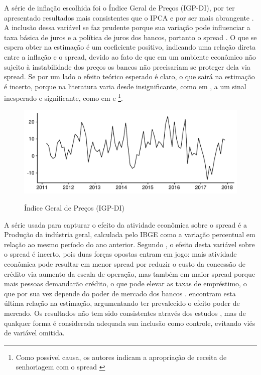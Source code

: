 \documentclass[a4paper, article, 12pt, openany, oneside, english, brazil]{abntex2}
\begin{document}
    A série de inflação escolhida foi o Índice Geral de Preços (IGP-DI), por ter apresentado resultados mais consistentes que o IPCA \cite[p.~66]{rocha09} e por ser mais abrangente \cite[p.~21]{afanasieff02}. A inclusão dessa variável se faz prudente porque sua variação pode influenciar a taxa básica de juros e a política de juros dos bancos, portanto o spread \cite[p.~14]{bignotto06}. O que se espera obter na estimação é um coeficiente positivo, indicando uma relação direta entre a inflação e o spread, devido ao fato de que em um ambiente econômico não sujeito à instabilidade dos preços os bancos não precisariam se proteger dela via spread. Se por um lado o efeito teórico esperado é claro, o que sairá na estimação é incerto, porque na literatura varia desde insignificante, como em , a um sinal inesperado e significante, como em  e \footnote{Como possível causa, os autores indicam a apropriação de receita de senhoriagem com o spread \cite[p.~25]{afanasieff02}}.
    
\begin{figure}[h]
  \centering
    \caption{Índice Geral de Preços (IGP-DI)}
      \includegraphics[width = \textwidth, scale=0.75]{IGP.pdf}
      \label{ipca}
\end{figure}
    
A série usada para capturar o efeito da atividade econômica sobre o spread é a Produção da indústria geral, calculada pelo IBGE como a variação percentual em relação ao mesmo período do ano anterior. Segundo , o efeito desta variável sobre o spread é incerto, pois duas forças opostas entram em jogo: mais atividade econômica pode resultar em menor spread por reduzir o custo da concessão de crédito via aumento da escala de operação, mas também em maior spread porque mais pessoas demandarão crédito, o que pode elevar as taxas de empréstimo, o que por sua vez depende do poder de mercado dos bancos .  encontram esta última relação na estimação, argumentando ter prevalecido o efeito poder de mercado. Os resultados não tem sido consistentes através dos estudos \cite[p.~236]{leal07}, mas de qualquer forma é considerada adequada sua inclusão como controle, evitando viés de variável omitida.
    
\end{document}
